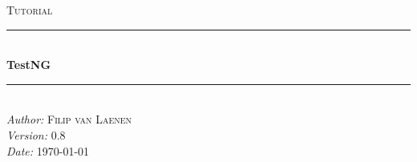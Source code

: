 %

\newcommand{\HRule}{\rule{\linewidth}{0.5mm}}

\begin{titlepage}
 
\begin{center}

\vspace*{9cm}

\textsc{\Large Tutorial}\\[0.5cm]

\HRule \\[0.4cm]

{ \huge \bfseries Test{\color{blue}{\bf X}}NG}\\[0.4cm]
 
\HRule \\[1.5cm]

\large
\emph{Author:} \textsc{Filip van Laenen}\\
\emph{Version:} 0.8\\
\emph{Date:} \textsc{\today}
 
\vfill
 
\end{center}
 
\end{titlepage}
